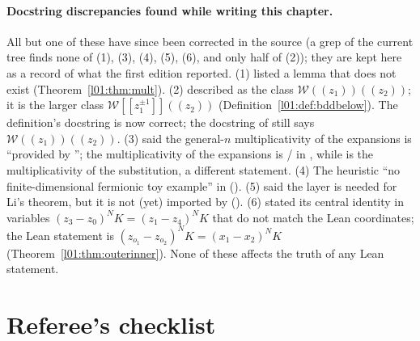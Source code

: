 \paragraph{Docstring discrepancies found while writing this chapter.}
All but one of these have since been corrected in the source (a grep of the current tree finds none of (1), (3), (4), (5),
(6), and only half of (2)); they are kept here as a record of what the first edition reported.
(1)  listed a lemma  that does not exist (Theorem~\ref{l01:thm:mult}).
(2)  described  as the class $\mathcal W((z_1))((z_2))$; it is the larger class
$\mathcal W[[z_1^{\pm1}]]((z_2))$ (Definition~\ref{l01:def:bddbelow}). The definition's docstring is now correct; the docstring
of  still says $\mathcal W((z_1))((z_2))$.
(3)  said the general-$n$ multiplicativity of the expansions is ``provided by
''; the multiplicativity of the expansions is / in
, while  is the multiplicativity of the substitution, a different
statement.
(4) The heuristic ``no finite-dimensional fermionic toy example'' in 
().
(5)  said the layer is needed for Li's theorem, but it is not (yet) imported by
 ().
(6)  stated its central identity in variables $(z_3-z_0)^NK = (z_1-z_4)^NK$ that do not
match the Lean coordinates; the Lean statement is $(z_{o_1}-z_{o_2})^NK = (x_1-x_2)^NK$ (Theorem~\ref{l01:thm:outerinner}).
None of these affects the truth of any Lean statement.

\section{Referee's checklist}\label{l01:sec:checklist}

